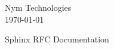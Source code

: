 \documentclass[10pt]{article}
\newcommand{\rfcId}{I-D}
\newcommand{\rfcTitle}{Sphinx RFC Documentation}
\newcommand{\rfcAuthor}{Nym Technologies}
\newcommand{\rfcDate}{\today}
\begin{document}
\begin{multicols}{2}
	\begin{flushleft}
	\end{flushleft}
\columnbreak
	\begin{flushright}
		\rfcAuthor \\
		\rfcDate
	\end{flushright}
\end{multicols}

\vspace{1in} { \center \rfcTitle \\ } \vspace{1in}


\tableofcontents
\pagebreak








\end{document}

